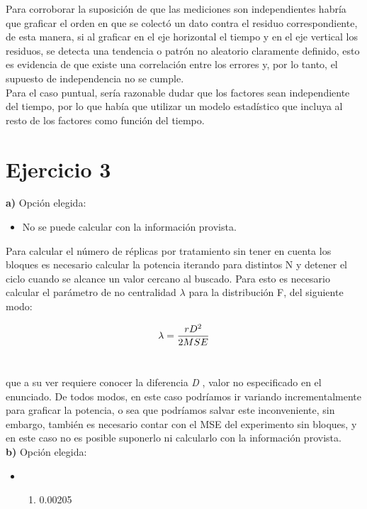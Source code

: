 \documentclass[11pt]{article}
\providecommand{\tightlist}{%
      \setlength{\itemsep}{0pt}\setlength{\parskip}{0pt}}
\begin{document}
Para corroborar la suposición de que las mediciones son independientes
habría que graficar el orden en que se colectó un dato contra el residuo
correspondiente, de esta manera, si al graficar en el eje horizontal el
tiempo y en el eje vertical los residuos, se detecta una tendencia o
patrón no aleatorio claramente definido, esto es evidencia de que existe
una correlación entre los errores y, por lo tanto, el supuesto de
independencia no se cumple.\\

Para el caso puntual, sería razonable dudar que los factores sean
independiente del tiempo, por lo que había que utilizar un modelo
estadístico que incluya al resto de los factores como función del
tiempo.

    \hypertarget{ejercicio-3}{%
\section*{Ejercicio 3}\label{ejercicio-3}}

    \textbf{a)} Opción elegida:

\begin{itemize}
\tightlist
\item
  No se puede calcular con la información provista.
\end{itemize}

Para calcular el número de réplicas por tratamiento sin tener en cuenta
los bloques es necesario calcular la potencia iterando para distintos N y detener el ciclo cuando se alcance un valor cercano al buscado. Para esto es necesario calcular el parámetro de no centralidad \(\lambda\) para la distribución F, del siguiente modo:

\[\lambda = {{rD^2} \over {2MSE}} \]\

que a su ver requiere conocer la diferencia \emph{D} , valor no especificado en el enunciado. De todos modos, en este caso podríamos ir variando incrementalmente para graficar la potencia, o
sea que podríamos salvar este inconveniente, sin embargo, también es
necesario contar con el MSE del experimento sin bloques, y en este caso
no es posible suponerlo ni calcularlo con la información provista.\\

\textbf{b)} Opción elegida:

\begin{itemize}
\item
  \begin{enumerate}
  \def\labelenumi{\arabic{enumi})}
  \setcounter{enumi}{4}
  \tightlist
  \item
    0.00205
  \end{enumerate}
\end{itemize}
\end{document}
